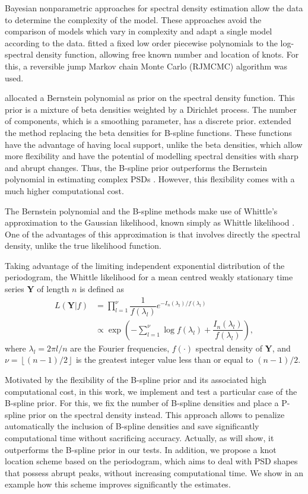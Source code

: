 \documentclass[aps,reprint,amsmath,amssymb,showpacs,showkeys]{revtex4-1}%
\begin{document}
Bayesian nonparametric approaches for spectral density estimation allow the data to determine the complexity of the model.  These approaches avoid the comparison of models which vary in complexity and adapt a single model according to the data. \cite{Gangopadhyay:1999} fitted a fixed low order piecewise polynomials to the log-spectral density function, allowing free known number and location of knots.  For this, a reversible jump Markov chain Monte Carlo (RJMCMC) \citep[RJMCMC;][]{Green:1995} algorithm was used.

\cite{Choudhuri:2004} allocated a Bernstein polynomial as prior on the spectral density function.  This prior is a mixture of beta densities weighted by a Dirichlet process.  The number of components, which is a smoothing parameter, has a discrete prior.  \cite{Edwards2018} extended the method replacing the beta densities for B-spline functions.  These functions have the advantage of having local support, unlike the beta densities, which allow more flexibility and have the potential of modelling spectral densities with sharp and abrupt changes.  Thus, the B-spline prior outperforms the Bernstein polynomial in estimating complex PSDs \citep{Edwards2018}.  However, this flexibility comes with a much higher computational cost.

The Bernstein polynomial and the B-spline methods make use of Whittle's approximation to the Gaussian likelihood, known simply as Whittle likelihood \citep{Whittle:1957}.  One of the advantages of this approximation is that involves directly the spectral density, unlike the true likelihood function.

Taking advantage of the limiting independent exponential distribution of the periodogram, the Whittle likelihood for a mean centred weakly stationary time series $\bm{Y}$ of length $n$ is defined as
\begin{align}
 L(\bm{Y} | f) &= \prod_{l=1}^{\nu}\dfrac{1}{f(\lambda_{l})} e^{-I_n(\lambda_l)/f(\lambda_l)}  \nonumber \\
 &\propto \exp \left( - \sum_{l=1}^{\nu} \log f(\lambda_l) + \dfrac{I_{n}(\lambda_l)}{f(\lambda_l)} \right), \label{eq:whittle_like}
\end{align}
where $\lambda_l = 2\pi l / n$ are the Fourier frequencies, $f(\cdot)$ spectral density of $\bm{Y}$, and $\nu = \left\lfloor (n-1)/2 \right\rfloor$ is the greatest integer value less than or equal to $(n-1)/2$.

Motivated by the flexibility of the B-spline prior and its associated high computational cost, in this work, we implement and test a particular case of the B-spline prior.  For this, we fix the number of B-spline densities and place a P-spline prior on the spectral density instead.  This approach allows to penalize automatically the inclusion of B-spline densities and save significantly computational time without sacrificing accuracy.  Actually, as will show, it outperforms the B-spline prior in our tests.  In addition, we propose a knot location scheme based on the periodogram, which aims to deal with PSD shapes that possess  abrupt peaks, without increasing computational time.  We show in an example how this scheme improves significantly the estimates.
\end{document}
